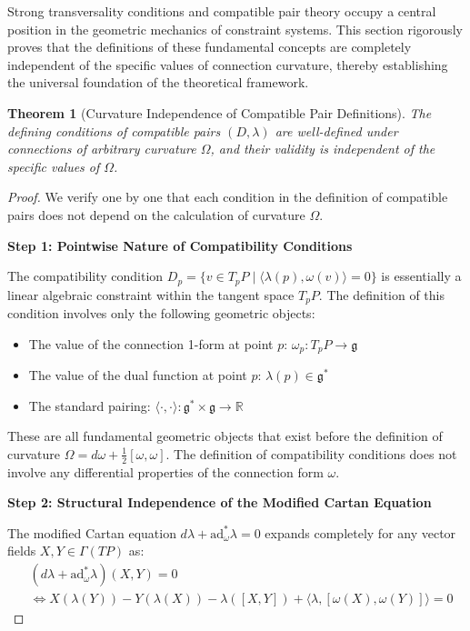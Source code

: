 \documentclass[a4paper,12pt]{extarticle}
\newtheorem{theorem}{Theorem}
\theoremstyle{definition}
\begin{document}
Strong transversality conditions and compatible pair theory occupy a central position in the geometric mechanics of constraint systems. This section rigorously proves that the definitions of these fundamental concepts are completely independent of the specific values of connection curvature, thereby establishing the universal foundation of the theoretical framework.

\begin{theorem}[Curvature Independence of Compatible Pair Definitions]
The defining conditions of compatible pairs $(D, \lambda)$ are well-defined under connections of arbitrary curvature $\Omega$, and their validity is independent of the specific values of $\Omega$.
\end{theorem}

\begin{proof}
We verify one by one that each condition in the definition of compatible pairs does not depend on the calculation of curvature $\Omega$.

\textbf{Step 1: Pointwise Nature of Compatibility Conditions}

The compatibility condition $D_p = \{v \in T_pP \mid \langle\lambda(p), \omega(v)\rangle = 0\}$ is essentially a linear algebraic constraint within the tangent space $T_pP$. The definition of this condition involves only the following geometric objects:
\begin{itemize}
\item The value of the connection 1-form at point $p$: $\omega_p: T_pP \to \mathfrak{g}$
\item The value of the dual function at point $p$: $\lambda(p) \in \mathfrak{g}^*$  
\item The standard pairing: $\langle \cdot, \cdot \rangle: \mathfrak{g}^* \times \mathfrak{g} \to \mathbb{R}$
\end{itemize}

These are all fundamental geometric objects that exist before the definition of curvature $\Omega = d\omega + \frac{1}{2}[\omega, \omega]$. The definition of compatibility conditions does not involve any differential properties of the connection form $\omega$.

\textbf{Step 2: Structural Independence of the Modified Cartan Equation}

The modified Cartan equation $d\lambda + \text{ad}_\omega^* \lambda = 0$ expands completely for any vector fields $X, Y \in \Gamma(TP)$ as:
\begin{align}
&(d\lambda + \text{ad}_\omega^* \lambda)(X, Y) = 0 \\
&\Leftrightarrow X(\lambda(Y)) - Y(\lambda(X)) - \lambda([X, Y]) + \langle\lambda, [\omega(X), \omega(Y)]\rangle = 0
\end{align}


\end{proof}
\end{document}
